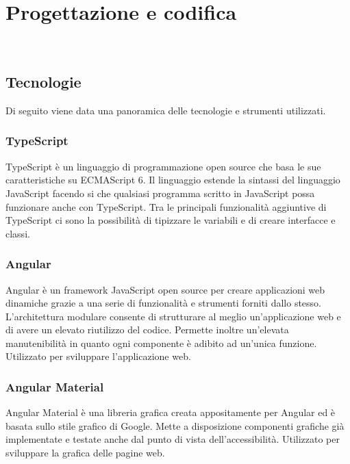 
\chapter{Progettazione e codifica}
\label{cap:progettazione-codifica}

\\

\section{Tecnologie}
\label{sec:tecnologie-strumenti}

Di seguito viene data una panoramica delle tecnologie e strumenti utilizzati.

\subsection*{TypeScript}
TypeScript è un linguaggio di programmazione open source che basa le sue caratteristiche su ECMAScript 6. Il linguaggio estende la sintassi del linguaggio JavaScript facendo si che qualsiasi programma scritto in JavaScript possa funzionare anche con TypeScript. Tra le principali funzionalità aggiuntive di TypeScript ci sono la possibilità di tipizzare le variabili e di creare interfacce e classi.\cite{site:typescript}

\subsection*{Angular}
Angular è un framework JavaScript open source per creare applicazioni web dinamiche grazie a una serie di funzionalità e strumenti forniti dallo stesso. L’architettura modulare consente di strutturare al meglio un’applicazione web e di avere un elevato riutilizzo del codice. Permette inoltre un’elevata manutenibilità in quanto ogni componente è adibito ad un’unica funzione. Utilizzato per sviluppare l’applicazione web.\cite{site:angular}

\subsection*{Angular Material}
Angular Material è una libreria grafica creata appositamente per Angular ed è basata sullo stile grafico di Google. Mette a disposizione componenti grafiche già implementate e testate anche dal punto di vista dell’accessibilità. Utilizzato per sviluppare la grafica delle pagine web.\cite{site:angular-material}


